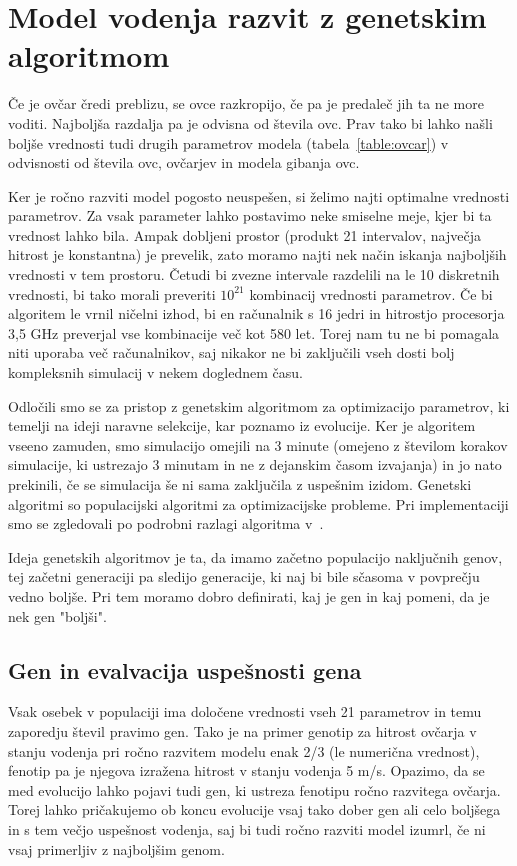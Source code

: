 \section{Model vodenja razvit z genetskim algoritmom} \label{genetski}

Če je ovčar čredi preblizu, se ovce razkropijo, če pa je predaleč jih ta ne more voditi. Najboljša razdalja pa je odvisna od števila ovc. Prav tako bi lahko našli boljše vrednosti tudi drugih parametrov modela (tabela~\ref{table:ovcar}) v odvisnosti od števila ovc, ovčarjev in modela gibanja ovc.

Ker je ročno razviti model pogosto neuspešen, si želimo najti optimalne vrednosti parametrov. Za vsak parameter lahko postavimo neke smiselne meje, kjer bi ta vrednost lahko bila. Ampak dobljeni prostor (produkt 21 intervalov, največja hitrost je konstantna) je prevelik, zato moramo najti nek način iskanja najboljših vrednosti v tem prostoru. Četudi bi zvezne intervale razdelili na le 10 diskretnih vrednosti, bi tako morali preveriti $10^{21}$ kombinacij vrednosti parametrov. Če bi algoritem le vrnil ničelni izhod, bi en računalnik s 16 jedri in hitrostjo procesorja 3,5 GHz preverjal vse kombinacije več kot 580 let. Torej nam tu ne bi pomagala niti uporaba več računalnikov, saj nikakor ne bi zaključili vseh dosti bolj kompleksnih simulacij v nekem doglednem času.

Odločili smo se za pristop z genetskim algoritmom za optimizacijo parametrov, ki temelji na ideji naravne selekcije, kar poznamo iz evolucije. Ker je algoritem vseeno zamuden, smo simulacijo omejili na 3 minute (omejeno z številom korakov simulacije, ki ustrezajo 3 minutam in ne z dejanskim časom izvajanja) in jo nato prekinili, če se simulacija še ni sama zaključila z uspešnim izidom. Genetski algoritmi so populacijski algoritmi za optimizacijske probleme. Pri implementaciji smo se zgledovali po podrobni razlagi algoritma v~\cite{natureOfCode}.

Ideja genetskih algoritmov je ta, da imamo začetno populacijo naključnih genov, tej začetni generaciji pa sledijo generacije, ki naj bi bile sčasoma v povprečju vedno boljše. Pri tem moramo dobro definirati, kaj je gen in kaj pomeni, da je nek gen "boljši".

\subsection{Gen in evalvacija uspešnosti gena}

Vsak osebek v populaciji ima določene vrednosti vseh 21 parametrov in temu zaporedju števil pravimo gen. Tako je na primer genotip za hitrost ovčarja v stanju vodenja pri ročno razvitem modelu enak 2/3 (le numerična vrednost), fenotip pa je njegova izražena hitrost v stanju vodenja 5 m/s. Opazimo, da se med evolucijo lahko pojavi tudi gen, ki ustreza fenotipu ročno razvitega ovčarja. Torej lahko pričakujemo ob koncu evolucije vsaj tako dober gen ali celo boljšega in s tem večjo uspešnost vodenja, saj bi tudi ročno razviti model izumrl, če ni vsaj primerljiv z najboljšim genom.


